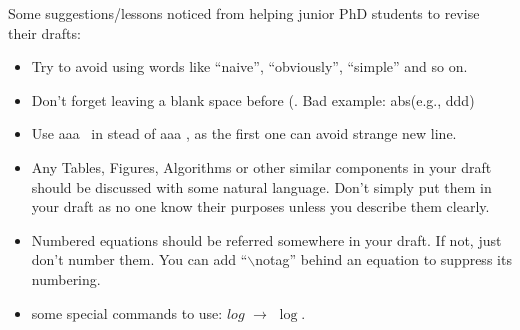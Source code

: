 Some suggestions/lessons noticed from helping junior PhD students to revise their drafts:
\begin{itemize}[leftmargin=*]
	\item Try to avoid using words like ``naive'', ``obviously'', ``simple'' and so on. 
	\item Don't forget leaving a blank space before (. Bad example: abs(e.g., ddd)
	\item Use aaa~\cite{cheng2016task} in stead of aaa \cite{cheng2016task}, as the first one can avoid strange
    \cite{cheng2016task} new line.
	\item Any Tables, Figures, Algorithms or other similar components in your draft should be discussed with some natural language. Don't simply put them in your draft as no one know their purposes unless you describe them clearly. 
	\item Numbered equations should be referred somewhere in your draft. If not, just don't number them. You can add ``$\backslash$notag'' behind an equation to suppress its numbering.
	\item some special commands to use: $log$ $\longrightarrow$ $\log$.
\end{itemize}

